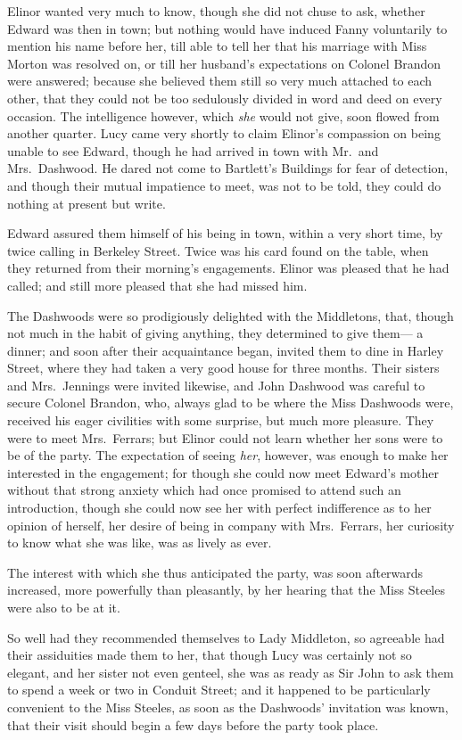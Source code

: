 Elinor wanted very much to know, though she did
not chuse to ask, whether Edward was then in town;
but nothing would have induced Fanny voluntarily
to mention his name before her, till able to tell her
that his marriage with Miss Morton was resolved on,
or till her husband's expectations on Colonel Brandon
were answered; because she believed them still so very
much attached to each other, that they could not be too
sedulously divided in word and deed on every occasion.
The intelligence however, which \emph{she} would not give,
soon flowed from another quarter.  Lucy came very shortly
to claim Elinor's compassion on being unable to see Edward,
though he had arrived in town with Mr.\ and Mrs.\ Dashwood.
He dared not come to Bartlett's Buildings for fear
of detection, and though their mutual impatience to meet,
was not to be told, they could do nothing at present
but write.

Edward assured them himself of his being in town,
within a very short time, by twice calling in Berkeley Street.
Twice was his card found on the table, when they returned
from their morning's engagements.  Elinor was pleased
that he had called; and still more pleased that she had
missed him.

The Dashwoods were so prodigiously delighted
with the Middletons, that, though not much in the habit
of giving anything, they determined to give them---%
a dinner; and soon after their acquaintance began,
invited them to dine in Harley Street, where they had
taken a very good house for three months.  Their sisters
and Mrs.\ Jennings were invited likewise, and John Dashwood
was careful to secure Colonel Brandon, who, always glad
to be where the Miss Dashwoods were, received his eager
civilities with some surprise, but much more pleasure.
They were to meet Mrs.\ Ferrars; but Elinor could not learn
whether her sons were to be of the party.  The expectation
of seeing \emph{her}, however, was enough to make her interested
in the engagement; for though she could now meet Edward's
mother without that strong anxiety which had once promised
to attend such an introduction, though she could now see
her with perfect indifference as to her opinion of herself,
her desire of being in company with Mrs.\ Ferrars,
her curiosity to know what she was like, was as lively as ever.

The interest with which she thus anticipated the
party, was soon afterwards increased, more powerfully
than pleasantly, by her hearing that the Miss Steeles
were also to be at it.

So well had they recommended themselves to Lady Middleton,
so agreeable had their assiduities made them to her,
that though Lucy was certainly not so elegant, and her
sister not even genteel, she was as ready as Sir John
to ask them to spend a week or two in Conduit Street;
and it happened to be particularly convenient to the Miss
Steeles, as soon as the Dashwoods' invitation was known,
that their visit should begin a few days before the party
took place.


